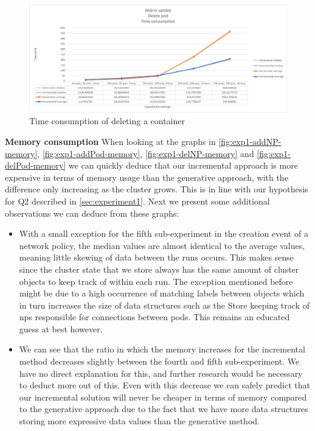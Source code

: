 \begin{figure}[H]
    \centering
    \includegraphics[width=\textwidth]{images/experiment1/delPod-time.png}
    \caption{Time consumption of deleting a container}
    \label{fig:exp1-delPod-time}
\end{figure}



\textbf{Memory consumption}
\newline When looking at the graphs in \autoref{fig:exp1-addNP-memory}, \autoref{fig:exp1-addPod-memory}, \autoref{fig:exp1-delNP-memory}  and \autoref{fig:exp1-delPod-memory} we can quickly deduce that our incremental approach is more expensive in terms of memory usage than the generative approach, with the difference only increasing as the cluster grows. This is in line with our hypothesis for Q2 described in \autoref{sec:experiment1}. Next we present some additional observations we can deduce from these graphs:
\begin{itemize}
    \item With a small exception for the fifth sub-experiment in the creation event of a network policy, the median values are almost identical to the average values, meaning little skewing of data between the runs occurs. This makes sense since the cluster state that we store always has the same amount of cluster objects to keep track of within each run. The exception mentioned before might be due to a high occurrence of matching labels between objects which in turn increases the size of data structures such as the Store keeping track of \acrshort{np}s responsible for connections between pods. This remains an educated guess at best however.
    \item We can see that the ratio in which the memory increases for the incremental method decreases slightly between the fourth and fifth sub-experiment. We have no direct explanation for this, and further research would be necessary to deduct more out of this. Even with this decrease we can safely predict that our incremental solution will never be cheaper in terms of memory compared to the generative approach due to the fact that we have more data structures storing more expressive data values than the generative method.
\end{itemize}

